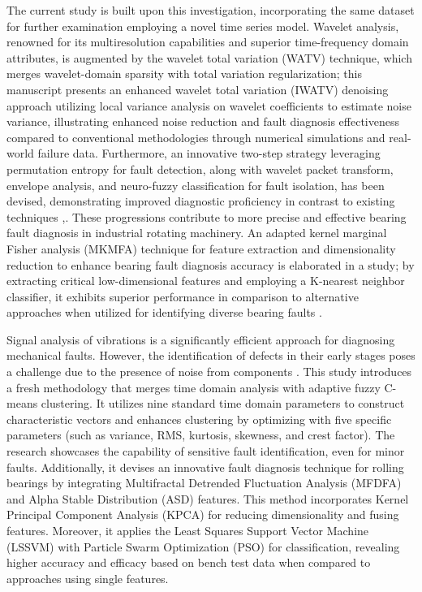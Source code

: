 \documentclass[sn-basic,pdflatex]{sn-jnl}
\theoremstyle{remark}
\theoremstyle{definition}
\begin{document}
The current study is built upon this investigation, incorporating the
same dataset for further examination employing a novel time series
model. Wavelet analysis, renowned for its multiresolution capabilities
and superior time-frequency domain attributes, is augmented by the
wavelet total variation (WATV) technique, which merges wavelet-domain
sparsity with total variation regularization; this manuscript presents
an enhanced wavelet total variation (IWATV) denoising approach utilizing
local variance analysis on wavelet coefficients to estimate noise
variance, illustrating enhanced noise reduction and fault diagnosis
effectiveness compared to conventional methodologies through numerical
simulations and real-world failure data. Furthermore, an innovative
two-step strategy leveraging permutation entropy for fault detection,
along with wavelet packet transform, envelope analysis, and neuro-fuzzy
classification for fault isolation, has been devised, demonstrating
improved diagnostic proficiency in contrast to existing techniques
\citep{WOS:000385104500001},\citep{RAJABI:2022117754}. These
progressions contribute to more precise and effective bearing fault
diagnosis in industrial rotating machinery. An adapted kernel marginal
Fisher analysis (MKMFA) technique for feature extraction and
dimensionality reduction to enhance bearing fault diagnosis accuracy is
elaborated in a study; by extracting critical low-dimensional features
and employing a K-nearest neighbor classifier, it exhibits superior
performance in comparison to alternative approaches when utilized for
identifying diverse bearing faults \citep{WOS:000392016300001}.

Signal analysis of vibrations is a significantly efficient approach for
diagnosing mechanical faults. However, the identification of defects in
their early stages poses a challenge due to the presence of noise from
components \citep[@WOS:000367992900001]{WOS:000369301600001}. This study
introduces a fresh methodology that merges time domain analysis with
adaptive fuzzy C-means clustering. It utilizes nine standard time domain
parameters to construct characteristic vectors and enhances clustering
by optimizing with five specific parameters (such as variance, RMS,
kurtosis, skewness, and crest factor). The research showcases the
capability of sensitive fault identification, even for minor faults.
Additionally, it devises an innovative fault diagnosis technique for
rolling bearings by integrating Multifractal Detrended Fluctuation
Analysis (MFDFA) and Alpha Stable Distribution (ASD) features. This
method incorporates Kernel Principal Component Analysis (KPCA) for
reducing dimensionality and fusing features. Moreover, it applies the
Least Squares Support Vector Machine (LSSVM) with Particle Swarm
Optimization (PSO) for classification, revealing higher accuracy and
efficacy based on bench test data when compared to approaches using
single features.
\end{document}
